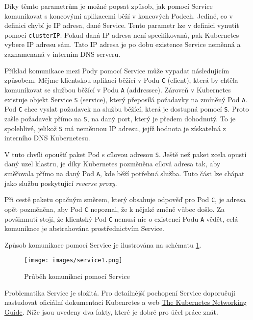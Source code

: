 Díky těmto parametrům je možné popsat způsob, jak pomocí Service komunikovat s koncovými aplikacemi běží v koncových Podech. Jediné, co v definici chybí je IP adresa, dané Service. Tento parametr lze v definici vynutit pomocí \verb|clusterIP|. Pokud daná IP adresa není specifikovaná, pak Kubernetes vybere IP adresu sám. Tato IP adresa je po dobu existence Service neměnná a zaznamenaná v interním DNS serveru. \cite{nassimkebbani_2022_the}

\bigskip

Příklad komunikace mezi Pody pomocí Service může vypadat následujícím způsobem. Mějme klientskou aplikaci běžící v Podu \verb|C| (client), která by chtěla komunikovat se službou běžící v Podu \verb|A| (addressee). Zároveň v Kubernetes existuje objekt Service \verb|S| (service), který přeposílá požadavky na zmíněný Pod \verb|A|. Pod \verb|C| chce vyslat požadavek na službu běžící, která je dostupná pomocí \verb|S|. Proto zašle požadavek přímo na \verb|S|, na daný port, který je předem dohodnutý. To je spolehlivé, jelikož \verb|S| má neměnnou IP adresu, jejíž hodnota je získatelná z interního DNS Kubernetesu.

V tuto chvíli opouští paket Pod s cílovou adresou \verb|S|. Ještě než paket zcela opustí daný uzel klastru, je díky Kubernetes pozměněna cílová adresa tak, aby směřovala přímo na daný Pod \verb|A|, kde běží potřebná služba. Tuto část lze chápat jako službu poskytující \textit{reverse proxy}.

Při cestě paketu opačným směrem, který obsahuje odpověď pro Pod \verb|C|, je adresa opět pozměněna, aby Pod \verb|C| nepoznal, že k nějaké změně vůbec došlo. Za povšimnutí stojí, že klientský Pod \verb|C| nemusí nic o existenci Podu \verb|A| vědět, celá komunikace je abstrahována prostřednictvím Service.

Způsob komunikace pomocí Service je ilustrována na schématu \ref{fig:service1}. 

\begin{figure}[!ht]
    \centering
    \texttt{[image: images/service1.png]}
    \caption[Průběh komunikaci pomocí Service]{Průběh komunikaci pomocí Service \cite{betz_2017_service}}
    \label{fig:service1}
\end{figure}

Problematika Service je složitá. Pro detailnější pochopení Service doporučuji nastudovat oficiální dokumentaci Kubenretes a web \href{https://www.tkng.io/}{The Kubernetes Networking Guide}. Níže jsou uvedeny dva fakty, které je dobré pro účel práce znát.


